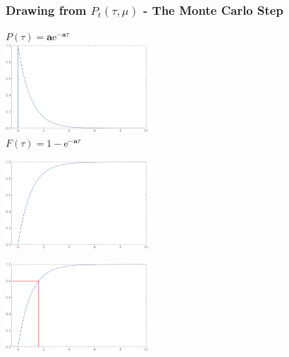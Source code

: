 \documentclass{beamer}
\newcommand{\expo}[1]{\text{e}^{#1}}
\begin{document}
\begin{frame}
\frametitle{Drawing from $P_t(\tau,\mu)$ - The Monte Carlo Step}
\centering
{}
$P(\tau)=\boldsymbol{a}\expo{-\boldsymbol{a}\tau}$\\
\vspace{1ex}
\includegraphics[width=0.4\textwidth]{pdf.png}\\
\vspace{1ex}
$F(\tau)=1-\expo{-\boldsymbol{a}\tau}$\\
\vspace{1ex}
\begin{overprint}
\begin{center}
\includegraphics[width=0.40\textwidth]{cdf.png} 
\end{center}
\begin{center}
\includegraphics[width=0.40\textwidth]{cumul.png} 
\end{center}
\end{overprint}


\end{frame}
\end{document}
